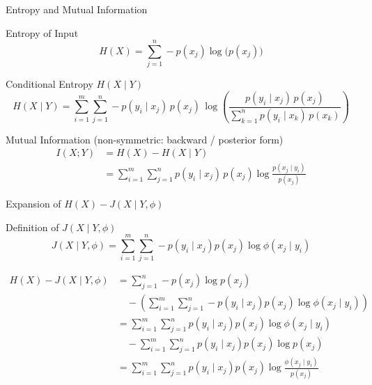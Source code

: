 \documentclass{beamer}
\begin{document}
\begin{frame}{Entropy and Mutual Information}
    \begin{block}{Entropy of Input}
        $$
        H(X) = \sum_{j=1}^{n} -p(x_j) \log\bigl(p(x_j)\bigr)
        $$
    \end{block}

    \begin{block}{Conditional Entropy $H(X \mid Y)$}
        $$
        H(X \mid Y) = \sum_{i=1}^{m} \sum_{j=1}^{n} -p(y_i \mid x_j)\, p(x_j)\, \log\!\left( \frac{p(y_i \mid x_j)\, p(x_j)}{\sum_{k=1}^{n} p(y_i \mid x_k)\, p(x_k)} \right)
        $$
    \end{block}

    \vspace*{-0.6em}
    \begin{block}{Mutual Information (non-symmetric: backward / posterior form)}
        \begin{align*}
            I(X; Y) &= H(X) - H(X \mid Y) \\
                    &= \sum_{i=1}^{m} \sum_{j=1}^{n} p(y_i \mid x_j)\, p(x_j) \log \frac{p(x_j \mid y_i)}{p(x_j)}
        \end{align*}
    \end{block}
\end{frame}

    \begin{frame}{Expansion of $H(X) - J(X \mid Y, \phi)$}
        \vspace*{-0.5em}
        \begin{block}{Definition of $J(X \mid Y, \phi)$}
            $$
            J(X \mid Y, \phi) = \sum_{i=1}^{m} \sum_{j=1}^{n} -p(y_i \mid x_j) p(x_j) \log \phi(x_j \mid y_i)
            $$
        \end{block}

        \vspace*{-1.4em}
        \small
        \setlength{\jot}{1pt}
        \begin{align*}
            H(X) - J(X \mid Y, \phi)
            &= \sum_{j=1}^{n} -p(x_j) \log p(x_j) \\
            &\quad - \left( \sum_{i=1}^{m} \sum_{j=1}^{n} -p(y_i \mid x_j) p(x_j) \log \phi(x_j \mid y_i) \right) \\
            &= \sum_{i=1}^{m} \sum_{j=1}^{n} p(y_i \mid x_j) p(x_j) \log \phi(x_j \mid y_i) \\
            &\quad - \sum_{i=1}^{m} \sum_{j=1}^{n} p(y_i \mid x_j) p(x_j) \log p(x_j) \\
            &= \sum_{i=1}^{m} \sum_{j=1}^{n} p(y_i \mid x_j) p(x_j) \log \frac{\phi(x_j \mid y_i)}{p(x_j)}
        \end{align*}
    \end{frame}
\end{document}
